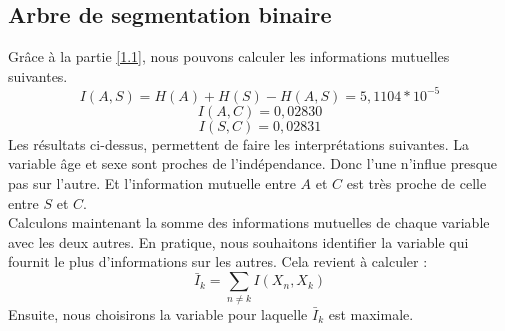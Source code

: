 \documentclass{article}
\begin{document}
\subsection{Arbre de segmentation binaire}
Grâce à la partie \ref{1.1}, nous pouvons calculer les informations mutuelles suivantes.
\[
I(A,S) = H(A) + H(S) - H(A,S) = 5,1104*10^{-5}
\]
\[
I(A,C) = 0,02830
\]
\[
I(S,C)= 0,02831
\]
Les résultats ci-dessus, permettent de faire les interprétations suivantes. La variable âge et sexe sont proches de l'indépendance. Donc l'une n'influe presque pas sur l'autre. Et l'information mutuelle entre $A$ et $C$ est très proche de celle entre $S$ et $C$.
\\
Calculons maintenant la somme des informations mutuelles de chaque variable avec les deux autres. En pratique, nous souhaitons identifier la variable qui fournit le plus d'informations sur les autres. Cela revient à calculer :
\begin{equation}
    \bar{I}_k = \sum_{n \neq k} I(X_n, X_k)
    \label{eq : I bar}
\end{equation}
Ensuite, nous choisirons la variable pour laquelle \( \bar{I}_k \) est maximale.
\end{document}
